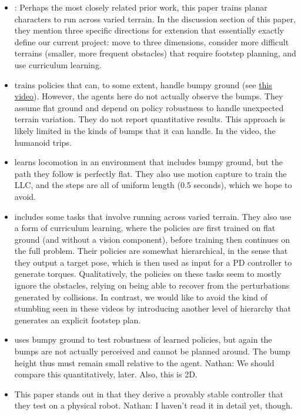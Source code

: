 \documentclass[a4paper]{article}
\newcommand{\nhatch}[1]{{\leavevmode\color{blue} Nathan: #1}}
\begin{document}
\begin{itemize}
  \item \cite{peng2016terrain}: Perhaps the most closely related prior work, this paper trains planar characters to run across varied terrain.
    In the discussion section of this paper, they mention three specific directions for extension that essentially exactly define our current project: move to three dimensions, consider more difficult terrains (smaller, more frequent obstacles) that require footstep planning, and use curriculum learning.

  \item \cite{heess2017emergence} trains policies that can, to some extent, handle bumpy ground (see \href{https://www.youtube.com/watch?v=hx_bgoTF7bs&feature=youtu.be&t=1m28s}{this video}).
    However, the agents here do not actually observe the bumps.
    They assume flat ground and depend on policy robustness to handle unexpected terrain variation.
    They do not report quantitative results.
    This approach is likely limited in the kinds of bumps that it can handle.
    In the video, the humanoid trips.

  \item \cite{peng2017deeploco}
    learns locomotion in an environment that includes bumpy ground, but the path they follow is perfectly flat.
    They also use motion capture to train the LLC, and the steps are all of uniform length (0.5 seconds), which we hope to avoid.

  \item \cite{peng2018deepmimic} includes some tasks that involve running across varied terrain.
    They also use a form of curriculum learning, where the policies are first trained on flat ground (and without a vision component), before training then continues on the full problem.
    Their policies are somewhat hierarchical, in the sense that they output a target pose, which is then used as input for a PD controller to generate torques.
    Qualitatively, the policies on these tasks seem to mostly ignore the obstacles, relying on being able to recover from the perturbations generated by collisions.
    In contrast, we would like to avoid the kind of stumbling seen in these videos by introducing another level of hierarchy that generates an explicit footstep plan.


  \item \cite{peng2017learning} uses bumpy ground to test robustness of learned policies, but again the bumps are not actually perceived and cannot be planned around.
    The bump height thus must remain small relative to the agent.
    \nhatch{We should compare this quantitatively, later.} Also, this is 2D.
  \item \cite{manchester2011stable} This paper stands out in that they derive a provably stable controller that they test on a physical robot.
    \nhatch{I haven't read it in detail yet, though.}
\end{itemize}
\end{document}
